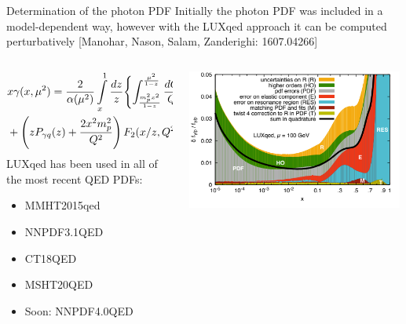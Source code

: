 \documentclass[aspectratio=169, 8pt,t]{beamer}
\begin{document}
\begin{frame}{Determination of the photon PDF}
  Initially the photon PDF was included in a model-dependent way, however with the LUXqed approach it can be computed perturbatively {\color{gray} [Manohar, Nason, Salam, Zanderighi: 1607.04266]}
  \begin{columns}[T]
    \begin{column}{0.59\textwidth}
      \begin{equation*}
        \begin{split}
          & x \gamma(x, \mu^2)
          =
          \frac{2}{\alpha (\mu^2)} \int\limits_x^1 \frac{dz}{z}
          \Biggl\{ \int_{m_p^2x^2 \over 1-z}^{\mu^2 \over 1-z} \frac{dQ^2}{Q^2}
          \alpha^2(Q^2) \Biggl[ -z^2 F_L(x/z, Q^2) \\
          & + \left( z P_{\gamma q}(z) + \frac{2 x^2 m_p^2}{Q^2} \right)
          F_2(x/z, Q^2)\Biggr] - \alpha^2(\mu^2) z^2 F_2(x/z, \mu^2)\Biggr\}
        \end{split}
      \end{equation*}
      LUXqed has been used in all of the most recent QED PDFs:
      \begin{itemize}
        \item MMHT2015qed
        \item NNPDF3.1QED
        \item CT18QED
        \item MSHT20QED
        \item Soon: NNPDF4.0QED
      \end{itemize}
    \end{column}

    \begin{column}{0.39\textwidth}
      \includegraphics[width=0.99\textwidth]{figures/luxQED_uncs.png}
    \end{column}
  \end{columns}
\end{frame}
\end{document}
